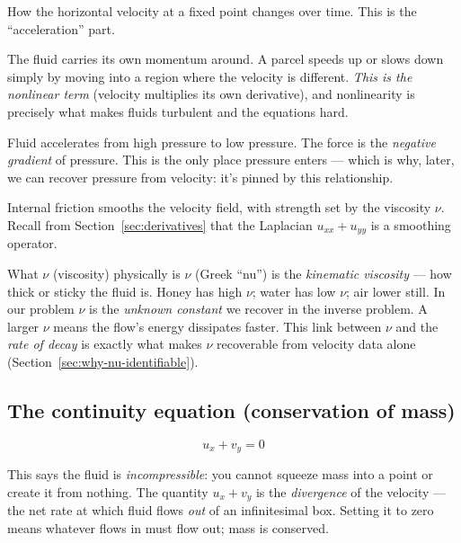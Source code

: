 \documentclass[11pt,a4paper]{article}
\begin{document}
\begin{description}[leftmargin=2em, style=nextline]
  \item[$u_t$ --- unsteady term] How the horizontal velocity at a fixed point
    changes over time. This is the ``acceleration'' part.
  \item[$u\,u_x + v\,u_y$ --- convection (advection)] The fluid carries its own
    momentum around. A parcel speeds up or slows down simply by moving into a
    region where the velocity is different. \emph{This is the nonlinear term}
    (velocity multiplies its own derivative), and nonlinearity is precisely what
    makes fluids turbulent and the equations hard.
  \item[$-p_x$ --- pressure gradient] Fluid accelerates from high pressure to
    low pressure. The force is the \emph{negative gradient} of pressure. This is
    the only place pressure enters --- which is why, later, we can recover
    pressure from velocity: it's pinned by this relationship.
  \item[$\nu(u_{xx}+u_{yy})$ --- viscous diffusion] Internal friction smooths the
    velocity field, with strength set by the viscosity $\nu$. Recall from
    Section~\ref{sec:derivatives} that the Laplacian $u_{xx}+u_{yy}$ is a
    smoothing operator.
\end{description}

\begin{conceptbox}{What $\nu$ (viscosity) physically is}
$\nu$ (Greek ``nu'') is the \emph{kinematic viscosity} --- how thick or sticky
the fluid is. Honey has high $\nu$; water has low $\nu$; air lower still. In our
problem $\nu$ is the \emph{unknown constant} we recover in the inverse problem.
A larger $\nu$ means the flow's energy dissipates faster. This link between
$\nu$ and the \emph{rate of decay} is exactly what makes $\nu$ recoverable from
velocity data alone (Section~\ref{sec:why-nu-identifiable}).
\end{conceptbox}

\subsection{The continuity equation (conservation of mass)}

\begin{equation}
u_x + v_y = 0
\label{eq:continuity}
\end{equation}

This says the fluid is \emph{incompressible}: you cannot squeeze mass into a
point or create it from nothing. The quantity $u_x + v_y$ is the
\emph{divergence} of the velocity --- the net rate at which fluid flows
\emph{out} of an infinitesimal box. Setting it to zero means whatever flows in
must flow out; mass is conserved.
\end{document}
